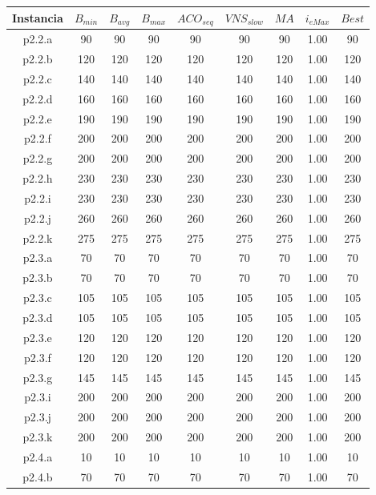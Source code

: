 \begin{table}
\begin{center}
\begin{tabular}{ |c|c|c|c|c|c|c|c|c| } 
\hline
Instancia & $B_{min}$ & $B_{avg}$ & $B_{max}$ & $ACO_{seq}$ & $VNS_{slow}$ & $MA$ & $i_{eMax}$ & $Best$ \\
\hline
p2.2.a & 90 & 90 & 90 & 90 & 90 & 90 & 1.00 & 90  \\
p2.2.b & 120 & 120 & 120 & 120 & 120 & 120 & 1.00 & 120  \\
p2.2.c & 140 & 140 & 140 & 140 & 140 & 140 & 1.00 & 140  \\
p2.2.d & 160 & 160 & 160 & 160 & 160 & 160 & 1.00 & 160  \\
p2.2.e & 190 & 190 & 190 & 190 & 190 & 190 & 1.00 & 190  \\
p2.2.f & 200 & 200 & 200 & 200 & 200 & 200 & 1.00 & 200  \\
p2.2.g & 200 & 200 & 200 & 200 & 200 & 200 & 1.00 & 200  \\
p2.2.h & 230 & 230 & 230 & 230 & 230 & 230 & 1.00 & 230  \\
p2.2.i & 230 & 230 & 230 & 230 & 230 & 230 & 1.00 & 230  \\
p2.2.j & 260 & 260 & 260 & 260 & 260 & 260 & 1.00 & 260  \\
p2.2.k & 275 & 275 & 275 & 275 & 275 & 275 & 1.00 & 275  \\
p2.3.a & 70 & 70 & 70 & 70 & 70 & 70 & 1.00 & 70  \\
p2.3.b & 70 & 70 & 70 & 70 & 70 & 70 & 1.00 & 70  \\
p2.3.c & 105 & 105 & 105 & 105 & 105 & 105 & 1.00 & 105  \\
p2.3.d & 105 & 105 & 105 & 105 & 105 & 105 & 1.00 & 105  \\
p2.3.e & 120 & 120 & 120 & 120 & 120 & 120 & 1.00 & 120  \\
p2.3.f & 120 & 120 & 120 & 120 & 120 & 120 & 1.00 & 120  \\
p2.3.g & 145 & 145 & 145 & 145 & 145 & 145 & 1.00 & 145  \\
p2.3.i & 200 & 200 & 200 & 200 & 200 & 200 & 1.00 & 200  \\
p2.3.j & 200 & 200 & 200 & 200 & 200 & 200 & 1.00 & 200  \\
p2.3.k & 200 & 200 & 200 & 200 & 200 & 200 & 1.00 & 200  \\
p2.4.a & 10 & 10 & 10 & 10 & 10 & 10 & 1.00 & 10  \\
p2.4.b & 70 & 70 & 70 & 70 & 70 & 70 & 1.00 & 70  \\

\end{tabular}
\end{center}
\end{table}
